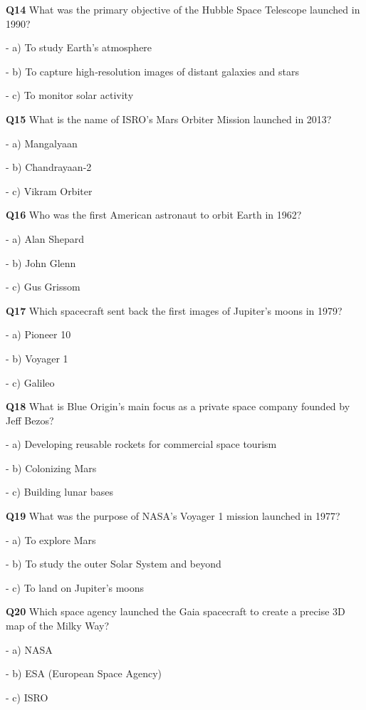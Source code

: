 \textbf{Q14} What was the primary objective of the Hubble Space Telescope launched in 1990?\par
\quad - a) To study Earth's atmosphere\par
\quad - b) To capture high‑resolution images of distant galaxies and stars\par
\quad - c) To monitor solar activity\par

\textbf{Q15} What is the name of ISRO's Mars Orbiter Mission launched in 2013?\par
\quad - a) Mangalyaan\par
\quad - b) Chandrayaan‑2\par
\quad - c) Vikram Orbiter\par

\textbf{Q16} Who was the first American astronaut to orbit Earth in 1962?\par
\quad - a) Alan Shepard\par
\quad - b) John Glenn\par
\quad - c) Gus Grissom\par

\textbf{Q17} Which spacecraft sent back the first images of Jupiter's moons in 1979?\par
\quad - a) Pioneer 10\par
\quad - b) Voyager 1\par
\quad - c) Galileo\par

\textbf{Q18} What is Blue Origin's main focus as a private space company founded by Jeff Bezos?\par
\quad - a) Developing reusable rockets for commercial space tourism\par
\quad - b) Colonizing Mars\par
\quad - c) Building lunar bases\par

\textbf{Q19} What was the purpose of NASA's Voyager 1 mission launched in 1977?\par
\quad - a) To explore Mars\par
\quad - b) To study the outer Solar System and beyond\par
\quad - c) To land on Jupiter's moons\par

\textbf{Q20} Which space agency launched the Gaia spacecraft to create a precise 3D map of the Milky Way?\par
\quad - a) NASA\par
\quad - b) ESA (European Space Agency)\par
\quad - c) ISRO\par

